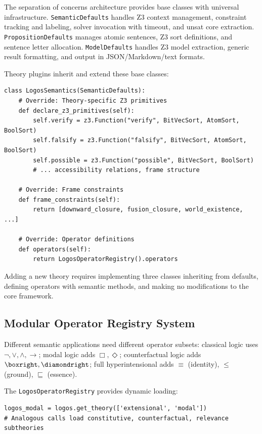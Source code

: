 \documentclass[pdflatex,sn-mathphys-num]{sn-jnl}
\newcommand{\nec}{\Box}                     %
\newcommand{\poss}{\Diamond}                %
\newcommand{\imp}{\to}                      %
\newcommand{\lneg}{\neg}                    %
\newcommand{\ground}{\leq}                  %
\newcommand{\essence}{\sqsubseteq}          %
\newcommand{\propident}{\equiv}             %
\theoremstyle{thmstyleone}
\theoremstyle{thmstyletwo}
\theoremstyle{thmstylethree}
\begin{document}
The separation of concerns architecture provides base classes with universal infrastructure.
\texttt{SemanticDefaults} handles Z3 context management, constraint tracking and labeling, solver invocation with timeout, and unsat core extraction.
\texttt{PropositionDefaults} manages atomic sentences, Z3 sort definitions, and sentence letter allocation.
\texttt{ModelDefaults} handles Z3 model extraction, generic result formatting, and output in JSON/Markdown/text formats.

Theory plugins inherit and extend these base classes:

\begin{lstlisting}[caption={Theory plugin inheritance}]
class LogosSemantics(SemanticDefaults):
    # Override: Theory-specific Z3 primitives
    def declare_z3_primitives(self):
        self.verify = z3.Function("verify", BitVecSort, AtomSort, BoolSort)
        self.falsify = z3.Function("falsify", BitVecSort, AtomSort, BoolSort)
        self.possible = z3.Function("possible", BitVecSort, BoolSort)
        # ... accessibility relations, frame structure

    # Override: Frame constraints
    def frame_constraints(self):
        return [downward_closure, fusion_closure, world_existence, ...]

    # Override: Operator definitions
    def operators(self):
        return LogosOperatorRegistry().operators
\end{lstlisting}

Adding a new theory requires implementing three classes inheriting from defaults, defining operators with semantic methods, and making no modifications to the core framework.

\subsection{Modular Operator Registry System}\label{sec:registry}

Different semantic applications need different operator subsets: classical logic uses $\lneg, \lor, \land, \imp$; modal logic adds $\nec, \poss$; counterfactual logic adds $\boxright, \diamondright$; full hyperintensional adds $\propident$ (identity), $\ground$ (ground), $\essence$ (essence).

The \texttt{LogosOperatorRegistry} provides dynamic loading:

\begin{lstlisting}[caption={Dynamic operator loading}]
logos_modal = logos.get_theory(['extensional', 'modal'])
# Analogous calls load constitutive, counterfactual, relevance subtheories
\end{lstlisting}
\end{document}
